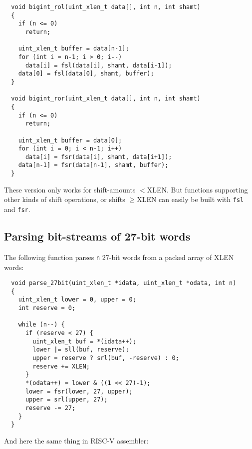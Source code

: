 \begin{minipage}{\linewidth}
\begin{verbatim}
  void bigint_rol(uint_xlen_t data[], int n, int shamt)
  {
    if (n <= 0)
      return;

    uint_xlen_t buffer = data[n-1];
    for (int i = n-1; i > 0; i--)
      data[i] = fsl(data[i], shamt, data[i-1]);
    data[0] = fsl(data[0], shamt, buffer);
  }

  void bigint_ror(uint_xlen_t data[], int n, int shamt)
  {
    if (n <= 0)
      return;

    uint_xlen_t buffer = data[0];
    for (int i = 0; i < n-1; i++)
      data[i] = fsr(data[i], shamt, data[i+1]);
    data[n-1] = fsr(data[n-1], shamt, buffer);
  }
\end{verbatim}
\end{minipage}

These version only works for shift-amounts $<$XLEN. But functions supporting
other kinds of shift operations, or shifts $\ge$XLEN can easily be built
with {\tt fsl} and {\tt fsr}.

\subsection{Parsing bit-streams of 27-bit words}

The following function parses {\tt n} 27-bit words from a packed array of XLEN words:

\begin{minipage}{\linewidth}
\begin{verbatim}
  void parse_27bit(uint_xlen_t *idata, uint_xlen_t *odata, int n)
  {
    uint_xlen_t lower = 0, upper = 0;
    int reserve = 0;

    while (n--) {
      if (reserve < 27) {
        uint_xlen_t buf = *(idata++);
        lower |= sll(buf, reserve);
        upper = reserve ? srl(buf, -reserve) : 0;
        reserve += XLEN;
      }
      *(odata++) = lower & ((1 << 27)-1);
      lower = fsr(lower, 27, upper);
      upper = srl(upper, 27);
      reserve -= 27;
    }
  }
\end{verbatim}
\end{minipage}

And here the same thing in RISC-V assembler:


